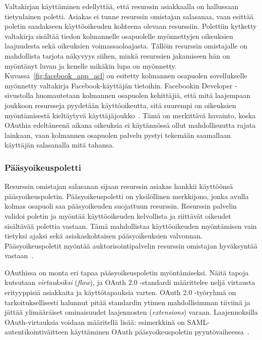 \documentclass[finnish,gradu]{tktltiki}
\begin{document}
  Valtakirjan käyttäminen edellyttää, että resurssin asiakkaalla on hallussaan tietynlainen poletti.   Asiakas ei tunne resurssin omistajan salasanaa, vaan esittää poletin saadakseen käyttöoikeuden kohteena olevaan resurssiin. Polettiin kytketty valtakirja sisältää tiedon kolmannelle osapuolelle myönnettyjen oikeuksien laajuudesta sekä oikeuksien voimassaoloajasta. Tällöin resurssin omistajalle on mahdollista tarjota näkyvyys siihen, minkä resurssien jakamiseen hän on myöntänyt luvan ja kenelle mikäkin lupa on myönnetty. Kuvassa~\ref{fig:facebook_app_acl} on esitetty kolmannen osapuolen sovellukselle myönnetty valtakirja Facebook-käyttäjän tietoihin. Facebookin Developer -sivustolla huomautetaan kolmannen osapuolen kehittäjiä, että mitä laajempaan joukkoon resursseja pyydetään käyttöoikeutta, sitä suurempi on oikeuksien myöntämisestä kieltäytyvä käyttäjäjoukko~\cite{facebook_oauth2_doc}. Tämä on merkittävä havainto, koska OAuthia edeltäneenä aikana oikeuksia ei käytännössä ollut mahdollisuutta rajata lainkaan, vaan kolmannen osapuolen palvelu pystyi tekemään saamallaan käyttäjän salasanalla mitä tahansa.


  \subsubsection{Pääsyoikeuspoletti} %
  \label{ssub:oauth_tokenit}

  Resurssin omistajan salasanan sijaan resurssin asiakas hankkii käyttöönsä pääsyoikeuspoletin. Pääsyoikeuspoletti on yksilöllinen merkkijono, jonka avulla kolmas osapuoli saa pääsyoikeuden suojattuun resurssin. Resurssin palvelin validoi poletin ja myöntää käyttöoikeuden kelvollista ja riittävät oikeudet sisältävää polettia vastaan. Tämä mahdollistaa käyttöoikeuden myöntämisen vain tietyksi ajaksi sekä asiakaskohtaisen pääsyoikeuksien valvonnan. Pääsyoikeuspoletit myöntää auktorisointipalvelin resurssin omistajan hyväksyntää vastaan~\cite{ietf_oauth2}.

  OAuthissa on monta eri tapaa pääsyoikeuspoletin myöntämiseksi. Näitä tapoja kutsutaan \emph{virtauksiksi} (\emph{flow}), ja OAuth 2.0 -standardi määrittelee neljä virtausta erityyppisiä asiakkaita ja käyttötapauksia varten. OAuth 2.0 -työryhmä on tarkoituksellisesti halunnut pitää standardin ytimen mahdollisimman tiiviinä ja jättää ylimääräiset ominaisuudet laajennosten (\emph{extensions}) varaan. Laajennoksilla OAuth-virtauksia voidaan määritellä lisää: esimerkkinä on SAML-autentikointiväitteen käyttäminen OAuth pääsyoikeuspoletin pyyntövaiheessa~\cite{ietf_oauth2_saml_bearer}.
\end{document}

